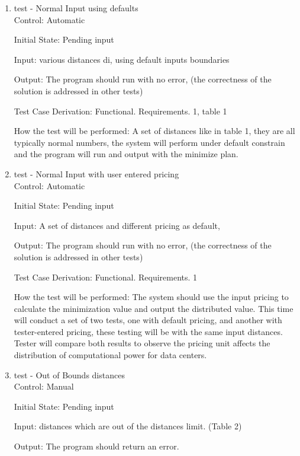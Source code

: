 \documentclass[12pt, titlepage]{article}
\begin{document}
\begin{enumerate}

\item{test - Normal Input using defaults}\\

Control: Automatic
					
Initial State: Pending input
					
Input: various distances di, using default inputs boundaries 
					
Output: The program should run with no error, (the correctness of the solution is addressed in other tests)

Test Case Derivation: Functional. Requirements. 1, table 1
					
How the test will be performed: A set of distances like in table 1, they are all typically normal numbers, the system will perform under default constrain and the program will run and output with the minimize plan. 

\item{test - Normal Input with user entered pricing}\\

Control: Automatic
					
Initial State: Pending input
					
Input: A set of distances and different pricing as default,
					
Output: The program should run with no error, (the correctness of the solution is addressed in other tests)

Test Case Derivation: Functional. Requirements. 1
					
How the test will be performed: The system should use the input pricing to calculate the minimization value and output the distributed value. This time will conduct a set of two tests, one with default pricing, and another with tester-entered pricing, these testing will be with the same input distances. Tester will compare both results to observe the pricing unit affects the distribution of computational power for data centers.

\item{test - Out of Bounds distances} \\

Control: Manual
					
Initial State: Pending input
					
Input: distances which are out of the distances limit. (Table 2)
					
Output: The program should return an error. 


\end{enumerate}
\end{document}
